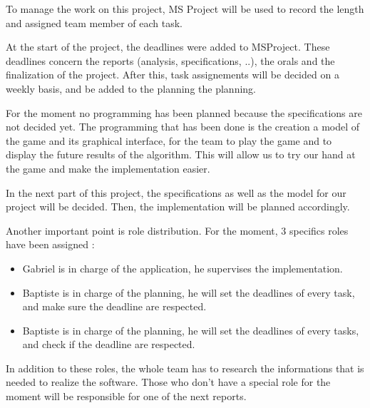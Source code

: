 \label{last last part}
To manage the work on this project, MS Project will be used to record the length and assigned team member of each task.
\newline

At the start of the project, the deadlines were added to MSProject. These deadlines concern the reports (analysis, specifications, ..), the orals and the finalization of the project. After this, task assignements will be decided on a weekly basis, and be added to the planning the planning.
\newline

For the moment no programming has been planned because the specifications are not decided yet. The programming that has been done is the creation a model of the game and its graphical interface, for the team to play the game and to display the future results of the algorithm. This will allow us to try our hand at the game and make the implementation easier.
\newline

In the next part of this project, the specifications as well as the model for our project will be decided. Then, the implementation will be planned accordingly.
\newline

Another important point is role distribution. For the moment, 3 specifics roles have been assigned : 
\begin{itemize}
\item Gabriel is in charge of the application, he supervises the implementation.
\item Baptiste is in charge of the planning, he will set the deadlines of every task, and make sure the deadline are respected.
\item Baptiste is in charge of the planning, he will set the deadlines of every tasks, and check if the deadline are respected.
\end{itemize}
In addition to these roles, the whole team has to research the informations that is needed to realize the software. Those who don't have a special role for the moment will be responsible for one of the next reports.